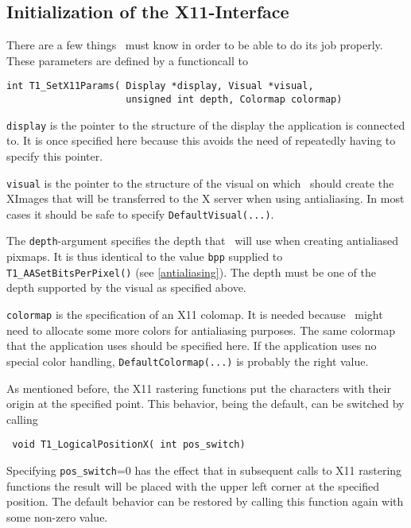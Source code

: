 \subsection{Initialization of the X11-Interface}
There are a few things \tonelib\ must know in order to be able to do its job
properly. These parameters are defined by a functioncall to
\precorr
\begin{verbatim}
int T1_SetX11Params( Display *display, Visual *visual,
                     unsigned int depth, Colormap colormap)
\end{verbatim}\postcorr
\verb+display+ is the pointer to the structure of the display the application
is connected to. It is once specified here because this avoids the need of
repeatedly having to specify this pointer. 

\verb+visual+ is the pointer to the structure of the visual on which 
\tonelib\ should create
the XImages that will be transferred to the X server when using antialiasing. In
most cases it should be safe to specify \verb+DefaultVisual(...)+.

The \verb+depth+-argument specifies the depth that \tonelib\ will use when
creating antialiased pixmaps. It is thus identical to the value \verb+bpp+
supplied to \verb+T1_AASetBitsPerPixel()+ (see \ref{antialiasing}).
The depth must be one of the depth supported by
the visual as specified above.

\verb+colormap+ is the specification of an X11 colomap. It is needed because
\tonelib\ might need to allocate some more colors for antialiasing
purposes. The same colormap that the application uses should be specified
here. If the application uses no special color handling,
\verb+DefaultColormap(...)+ is probably the right value.

As mentioned before, the X11 rastering functions put the characters with their
origin at the specified point. This behavior, being the default, can be
switched by calling 
\precorr
\begin{verbatim}
 void T1_LogicalPositionX( int pos_switch)
\end{verbatim}\postcorr
Specifying \verb+pos_switch+=0 has the effect that in subsequent calls to X11
rastering functions the result will be placed with the upper left corner at
the specified position. The default behavior can be restored by calling this
function again with some non-zero value.


